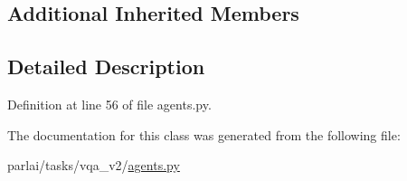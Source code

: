 \subsection*{Additional Inherited Members}


\subsection{Detailed Description}


Definition at line 56 of file agents.\+py.



The documentation for this class was generated from the following file\+:\begin{DoxyCompactItemize}
\item 
parlai/tasks/vqa\+\_\+v2/\hyperlink{parlai_2tasks_2vqa__v2_2agents_8py}{agents.\+py}\end{DoxyCompactItemize}
